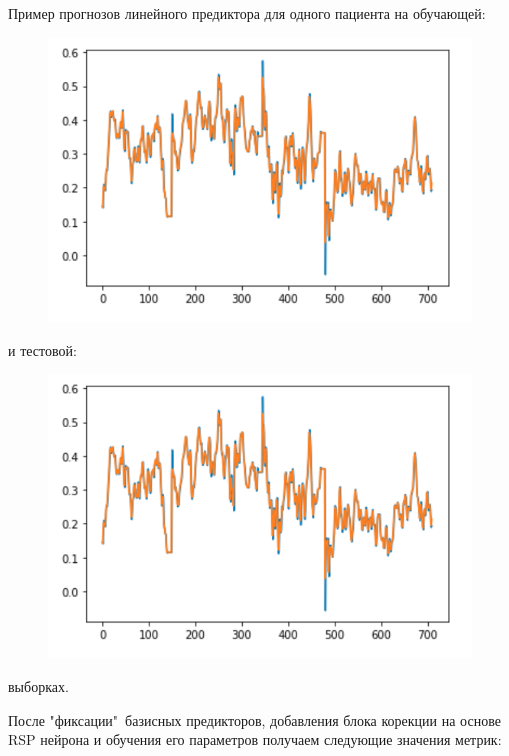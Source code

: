 \documentclass[11pt]{article}
\begin{document}
Пример прогнозов линейного предиктора для одного пациента на обучающей:
\begin{figure}[H]
\centering
\includegraphics[scale=0.35]{baseline_train_forecast.png}
\label{}
\end{figure}
 и тестовой:
\begin{figure}[H]
\centering
\includegraphics[scale=0.35]{baseline_train_forecast.png}
\label{}
\end{figure}
выборках.

После "фиксации"\ базисных предикторов, добавления блока корекции на основе RSP нейрона и обучения его параметров получаем следующие значения метрик:
\end{document}
